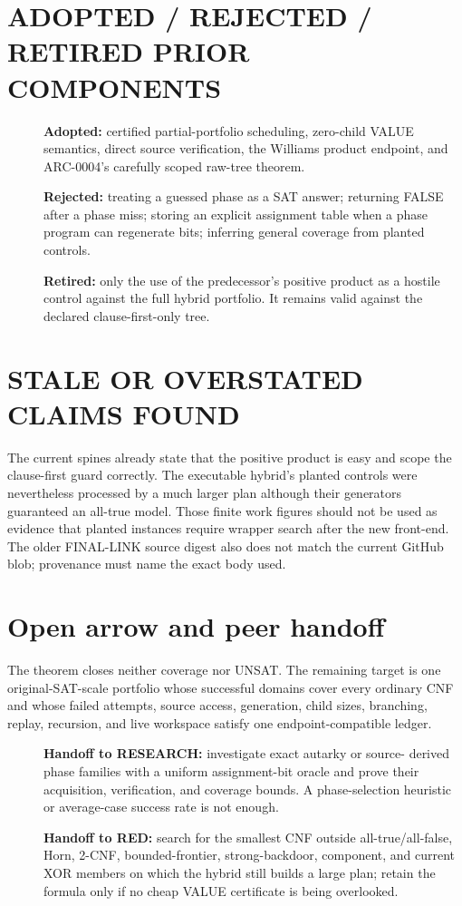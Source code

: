 \documentclass[11pt]{article}
\begin{document}
\section{ADOPTED / REJECTED / RETIRED PRIOR COMPONENTS}
\begin{description}
\item[] \textbf{Adopted:} certified partial-portfolio scheduling, zero-child
VALUE semantics, direct source verification, the Williams product endpoint,
and ARC-0004's carefully scoped raw-tree theorem.
\item[] \textbf{Rejected:} treating a guessed phase as a SAT answer; returning
FALSE after a phase miss; storing an explicit assignment table when a phase
program can regenerate bits; inferring general coverage from planted controls.
\item[] \textbf{Retired:} only the use of the predecessor's positive product
as a hostile control against the full hybrid portfolio.  It remains valid
against the declared clause-first-only tree.
\end{description}

\section{STALE OR OVERSTATED CLAIMS FOUND}
The current spines already state that the positive product is easy and scope
the clause-first guard correctly.  The executable hybrid's planted controls
were nevertheless processed by a much larger plan although their generators
guaranteed an all-true model.  Those finite work figures should not be used as
evidence that planted instances require wrapper search after the new
front-end.  The older FINAL-LINK source digest also does not match the current
GitHub blob; provenance must name the exact body used.

\section{Open arrow and peer handoff}
The theorem closes neither coverage nor UNSAT.  The remaining target is one
original-SAT-scale portfolio whose successful domains cover every ordinary
CNF and whose failed attempts, source access, generation, child sizes,
branching, replay, recursion, and live workspace satisfy one endpoint-compatible
ledger.

\begin{description}
\item[] \textbf{Handoff to RESEARCH:} investigate exact autarky or source-
derived phase families with a uniform assignment-bit oracle and prove their
acquisition, verification, and coverage bounds.  A phase-selection heuristic
or average-case success rate is not enough.
\item[] \textbf{Handoff to RED:} search for the smallest CNF outside
all-true/all-false, Horn, 2-CNF, bounded-frontier, strong-backdoor, component,
and current XOR members on which the hybrid still builds a large plan; retain
the formula only if no cheap VALUE certificate is being overlooked.
\end{description}



\end{document}
